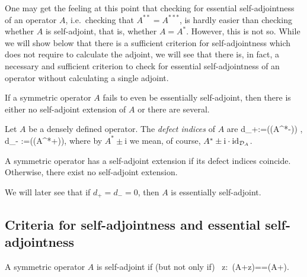 \br
One may get the feeling at this point that checking for essential self-adjointness of an operator $A$, i.e.\ checking that $A^{**}=A^{***}$, is hardly easier than checking whether $A$ is self-adjoint, that is, whether $A=A^*$. However, this is not so. While we will show below that there is a sufficient criterion for self-adjointness which does not require to calculate the adjoint, we will see that there is, in fact, a necessary and sufficient criterion to check for essential self-adjointness of an operator without calculating a single adjoint.
\er

\br
If a symmetric operator $A$ fails to even be essentially self-adjoint, then there is either no self-adjoint extension of $A$ or there are several. 
\er

\bd
Let $A$ be a densely defined operator. The \emph{defect indices} of $A$ are
\bse
d_+:=\dim (\ker(A^*-)) , \qquad \quad d_- :=\dim (\ker (A^*+)),
\ese
where by $A^*\pm\mathrm{i}$ we mean, of course, $A^*\pm\mathrm{i}\cdot\operatorname{id}_{\mathcal{D}_A}$.
\ed

\bt
A symmetric operator has a self-adjoint extension if its defect indices coincide. Otherwise, there exist no self-adjoint extension.
\et

\br
We will later see that if $d_+=d_-=0$, then $A$ is essentially self-adjoint.
\er

\subsection{Criteria for self-adjointness and essential self-adjointness}


\bt
A symmetric operator $A$ is self-adjoint if (but not only if)
\bse
\exists \, z\in\C :\ \ran(A+z)==\ran(A+).
\ese
\et

